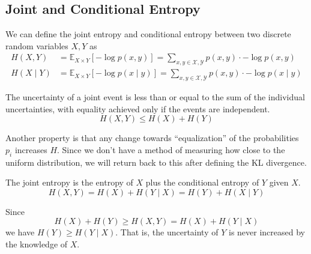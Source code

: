 \documentclass{article}
\begin{document}
  \subsection{Joint and Conditional Entropy}

    \begin{definition}
      We can define the joint entropy and conditional entropy between two discrete random variables $X, Y$ as 
      \begin{align*}
        H(X, Y) & = \mathbb{E}_{X \times Y} [-\log p(x, y)] = \sum_{x, y \in \mathcal{X}, \mathcal{Y}} p(x, y) \cdot - \log p(x, y) \\
        H(X \mid Y) & = \mathbb{E}_{X \times Y} [- \log p(x \mid y)]  = \sum_{x, y \in \mathcal{X}, \mathcal{Y}} p(x, y) \cdot - \log p(x \mid y )
      \end{align*}
    \end{definition}

    \begin{theorem}
      The uncertainty of a joint event is less than or equal to the sum of the individual uncertainties, with equality achieved only if the events are independent. 
      \begin{equation}
        H(X, Y) \leq H(X) + H(Y)
      \end{equation}
    \end{theorem}

    Another property is that any change towards ``equalization'' of the probabilities $p_i$ increases $H$. Since we don't have a method of measuring how close to the uniform distribution, we will return back to this after defining the KL divergence.  

    \begin{theorem}
      The joint entropy is the entropy of $X$ plus the conditional entropy of $Y$ given $X$. 
      \begin{equation}
        H(X, Y) = H(X) + H(Y \mid X) = H(Y) + H(X \mid Y)
      \end{equation}
    \end{theorem}

    \begin{theorem}
      Since 
      \begin{equation}
        H(X) + H(Y) \geq H(X, Y) = H(X) + H(Y \mid X)
      \end{equation}
      we have $H(Y) \geq H(Y \mid X)$. That is, the uncertainty of $Y$ is never increased by the knowledge of $X$. 
    \end{theorem}
\end{document}
